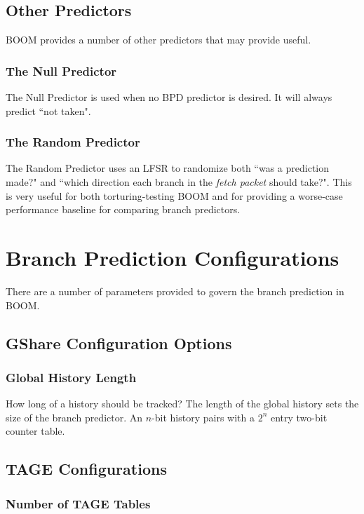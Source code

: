 \subsection{Other Predictors}

BOOM provides a number of other predictors that may provide useful.

\subsubsection{The Null Predictor}

The Null Predictor is used when no BPD predictor is desired. It will always predict ``not taken".

\subsubsection{The Random Predictor}

The Random Predictor uses an LFSR to randomize both ``was a prediction made?" and ``which direction each branch in the {\em fetch packet} should take?".  This is very useful for both torturing-testing BOOM and for providing a worse-case performance baseline for comparing branch predictors.

\section{Branch Prediction Configurations}

There are a number of parameters provided to govern the branch prediction in BOOM.

\subsection{GShare Configuration Options}

\subsubsection{Global History Length}

How long of a history should be tracked?  The length of the global history sets the size of the branch predictor. An $n$-bit history pairs with a $2^n$ entry two-bit counter table. 

\subsection{TAGE Configurations}

\subsubsection{Number of TAGE Tables}

